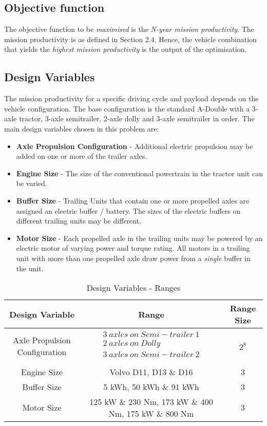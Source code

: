\documentclass[ExampleMasters.tex]{subfiles}
\begin{document}
		\subsection{Objective function}
			The objective function to be \textit{maximised} is the \textit{N-year mission productivity}. The mission productivity is as defined in Section 2.4. Hence, the vehicle combination that yields the \textit{highest mission productivity} is the output of the optimisation.

		\subsection{Design Variables}
			The mission productivity for a specific driving cycle and payload depends on the vehicle configuration. The base configuration is the standard A-Double with a 3-axle tractor, 3-axle semitrailer, 2-axle dolly and 3-axle semitrailer in order. The main design variables chosen in this problem are:

			\begin{itemize}
				\item \textbf{Axle Propulsion Configuration} - Additional electric propulsion may be added on one or more of the trailer axles.
				\item \textbf{Engine Size} - The size of the conventional powertrain in the tractor unit can be varied.
				\item \textbf{Buffer Size} - Trailing Units that contain one or more propelled axles are assigned an electric buffer / battery. The sizes of the electric buffers on different trailing units may be different.
				\item \textbf{Motor Size} - Each propelled axle in the trailing units may be powered by an electric motor of varying power and torque rating. All motors in a trailing unit with more than one propelled axle draw power from a \textit{single} buffer in the unit.
			\end{itemize}

			\begin{table}[ht]
				\caption{Design Variables - Ranges}
				\centering
				\begin{tabular}{c c c}
				\hline\hline
				Design Variable & Range & Range Size \\
				\hline
				Axle Propulsion Configuration & $\begin{matrix}
													3\ axles\ on\ Semi-trailer\ 1\\
													2\ axles\ on\ Dolly\\
													3\ axles\ on\ Semi-trailer\ 2\\
												\end{matrix}$ & $2^8$\\
				Engine Size & Volvo D11, D13 \& D16 & 3\\
				Buffer Size & 5 kWh, 50 kWh \& 91 kWh & 3\\
				Motor Size & 125 kW \& 230 Nm, 173 kW \& 400 Nm, 175 kW \& 800 Nm & 3 \\
				\hline
				\end{tabular}
				\label{table:designParameters}
			\end{table}
\end{document}
